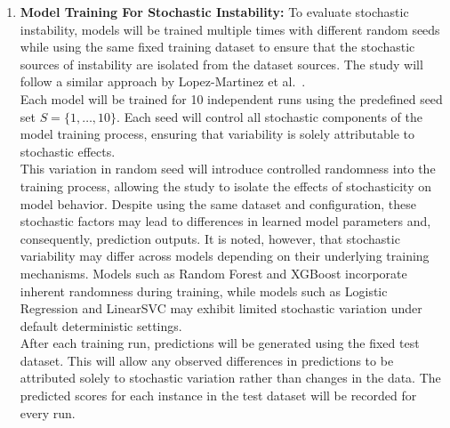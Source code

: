 \documentclass[12pt]{article}
\begin{document}
\begin{enumerate}
  Each model will then be retrained independently on every bootstrapped sample with a fixed random seed of $ s = 0$. After training, predictions will be generated using the fixed test dataset and stored in structured CSV files with the filename $<model>\_bs\_pred.csv$, where each column represents the predicted scores from a specific training run. This organized storage will enable direct comparison of predictions across multiple runs for each individual.\\

  By repeating this process across all bootstrapped samples, the study will produce a distribution of predictions for each test instance which will serve as the basis for computing instability metrics in later stages of the methodology.

  \item \textbf{Model Training For Stochastic Instability:}
  To evaluate stochastic instability, models will be trained multiple times with different random seeds while using the same fixed training dataset to ensure that the stochastic sources of instability are isolated from the dataset sources. The study will follow a similar approach by Lopez-Martinez et al.~\cite{lopez2022instability}.\\

  Each model will be trained for 10 independent runs using the predefined seed set $S = \{1,\dots,10\}$. Each seed will control all stochastic components of the model training process, ensuring that variability is solely attributable to stochastic effects.\\

  This variation in random seed will introduce controlled randomness into the training process, allowing the study to isolate the effects of stochasticity on model behavior. Despite using the same dataset and configuration, these stochastic factors may lead to differences in learned model parameters and, consequently, prediction outputs. It is noted, however, that stochastic variability may differ across models depending on their underlying training mechanisms. Models such as Random Forest and XGBoost incorporate inherent randomness during training, while models such as Logistic Regression and LinearSVC may exhibit limited stochastic variation under default deterministic settings.\\

  After each training run, predictions will be generated using the fixed test dataset. This will allow any observed differences in predictions to be attributed solely to stochastic variation rather than changes in the data. The predicted scores for each instance in the test dataset will be recorded for every run. \\


\end{enumerate}
\end{document}
